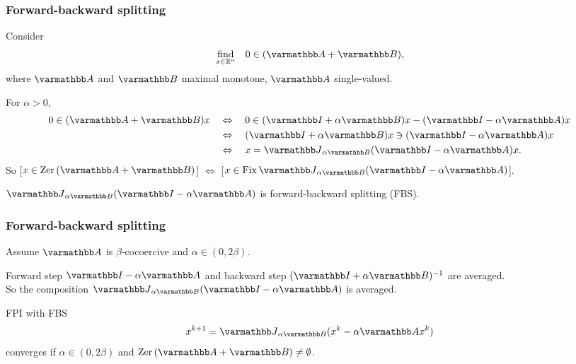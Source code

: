 \documentclass[10pt,mathserif]{beamer}
\begin{document}
\begin{frame}
\frametitle{Forward-backward splitting}
Consider
\[
\begin{array}{ll}
\underset{x\in \reals^n}{\mbox{find}}&0\in (\opA+\opB ),
\end{array}
\]
where $\opA$ and $\opB $ maximal monotone, $\opA$ single-valued.
\vspace{0.2in}

For $\alpha>0$,
\begin{align*}
0\in (\opA+\opB )x
\quad&\Leftrightarrow\quad
0\in (\opI+\alpha \opB )x-(\opI-\alpha \opA)x
\\
&\Leftrightarrow\quad
(\opI+\alpha \opB )x\ni (\opI-\alpha \opA)x\\
&\Leftrightarrow\quad
x=\opJ_{\alpha \opB }(\opI-\alpha \opA)x.
\end{align*}
So
[$x\in\zer (\opA+\opB)$] $\Leftrightarrow$ [$x\in \fix\opJ_{\alpha \opB }(\opI-\alpha \opA)$].

\vspace{0.2in}

$\opJ_{\alpha \opB }(\opI-\alpha \opA)$ is forward-backward splitting (FBS).

\end{frame}

\begin{frame}
\frametitle{Forward-backward splitting}

Assume $\opA$ is $\beta$-cocoercive and $\alpha\in (0,2\beta)$.

\vspace{0.2in}


Forward step $\opI-\alpha \opA$ and backward step
$(\opI+\alpha \opB )^{-1}$ are averaged.\\
So the composition $\opJ_{\alpha \opB }(\opI-\alpha \opA)$ is averaged.


\vspace{0.2in}


FPI with FBS
\[
x^{k+1} = \opJ_{\alpha \opB }(x^k-\alpha \opA x^k)
\]
converges if $\alpha\in (0,2\beta)$ and $\zer(\opA+\opB )\ne\emptyset$.

\end{frame}
\end{document}
